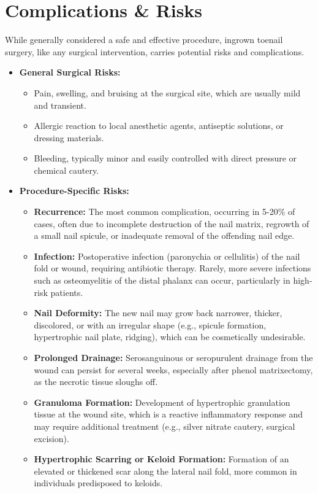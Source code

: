 \section*{Complications \& Risks}
While generally considered a safe and effective procedure, ingrown toenail surgery, like any surgical intervention, carries potential risks and complications.

\begin{itemize}
  \item  \textbf{General Surgical Risks:}
    \begin{itemize}
      \item Pain, swelling, and bruising at the surgical site, which are usually mild and transient.
      \item Allergic reaction to local anesthetic agents, antiseptic solutions, or dressing materials.
      \item Bleeding, typically minor and easily controlled with direct pressure or chemical cautery.
    \end{itemize}
  \item  \textbf{Procedure-Specific Risks:}
    \begin{itemize}
      \item  \textbf{Recurrence:} The most common complication, occurring in 5-20\% of cases, often due to incomplete destruction of the nail matrix, regrowth of a small nail spicule, or inadequate removal of the offending nail edge.
      \item  \textbf{Infection:} Postoperative infection (paronychia or cellulitis) of the nail fold or wound, requiring antibiotic therapy. Rarely, more severe infections such as osteomyelitis of the distal phalanx can occur, particularly in high-risk patients.
      \item  \textbf{Nail Deformity:} The new nail may grow back narrower, thicker, discolored, or with an irregular shape (e.g., spicule formation, hypertrophic nail plate, ridging), which can be cosmetically undesirable.
      \item  \textbf{Prolonged Drainage:} Serosanguinous or seropurulent drainage from the wound can persist for several weeks, especially after phenol matrixectomy, as the necrotic tissue sloughs off.
      \item  \textbf{Granuloma Formation:} Development of hypertrophic granulation tissue at the wound site, which is a reactive inflammatory response and may require additional treatment (e.g., silver nitrate cautery, surgical excision).
      \item  \textbf{Hypertrophic Scarring or Keloid Formation:} Formation of an elevated or thickened scar along the lateral nail fold, more common in individuals predisposed to keloids.

\end{itemize}
\end{itemize}

